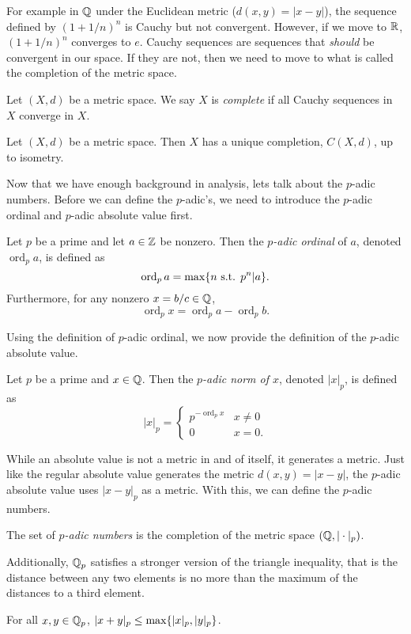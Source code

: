 \documentclass[notitlepage]{problem-solving}
\def\ord{\operatorname{ord}}
\begin{document}
For example in $\mathbb{Q}$ under the Euclidean metric ($d(x,y)=|x-y|$), the sequence defined by $(1+1/n)^n$ is Cauchy but not convergent.
However, if we move to $\mathbb{R}$, $(1+1/n)^n$ converges to $e$.
Cauchy sequences are sequences that \textit{should} be convergent in our space.
If they are not, then we need to move to what is called the completion of the metric space.
\begin{definition}
	Let $(X,d)$ be a metric space.
	We say $X$ is \textit{complete} if all Cauchy sequences in $X$ converge in $X$.
\end{definition}
\begin{thm}
	Let $(X,d)$ be a metric space.
	Then $X$ has a unique completion, $C(X,d)$, up to isometry.
\end{thm}

Now that we have enough background in analysis, lets talk about the $p$-adic numbers.
Before we can define the $p$-adic's, we need to introduce the $p$-adic ordinal and $p$-adic absolute value first.
\begin{definition}
	Let $p$ be a prime and let $a\in\mathbb{Z}$ be nonzero.
	Then the \textit{$p$-adic ordinal} of $a$, denoted $\ord_p a$, is defined as
	\[
		\ord_p a = \max\set{n\text{ s.t. } p^n | a}.
	\]
	Furthermore, for any nonzero $x=b/c\in\mathbb{Q}$,
	\[
		\ord_p x = \ord_p a - \ord_p b.
	\]
\end{definition}
Using the definition of $p$-adic ordinal, we now provide the definition of the $p$-adic absolute value.
\begin{definition}
	Let $p$ be a prime and $x\in\mathbb{Q}$.
	Then the \textit{$p$-adic norm of $x$}, denoted $|x|_p$, is defined as
	\[
		|x|_p =
		\begin{cases}
			p^{-\ord_p x} & x\neq 0\\
			0 & x=0.
		\end{cases}
	\]
\end{definition}
While an absolute value is not a metric in and of itself, it generates a metric.
Just like the regular absolute value generates the metric $d(x,y)=|x-y|$, the $p$-adic absolute value uses $|x-y|_p$ as a metric.
With this, we can define the $p$-adic numbers.
\begin{definition}
	The set of \textit{$p$-adic numbers} is the completion of the metric space $(\mathbb{Q},|\cdot|_p)$.
\end{definition}
Additionally, $\mathbb{Q}_p$ satisfies a stronger version of the triangle inequality, that is the distance between any two elements is no more than the maximum of the distances to a third element.
\begin{thm}
	For all $x,y\in\mathbb{Q}_p$, $|x+y|_p\leq\max\lbrace |x|_p,|y|_p \rbrace$.
\end{thm}
\end{document}
